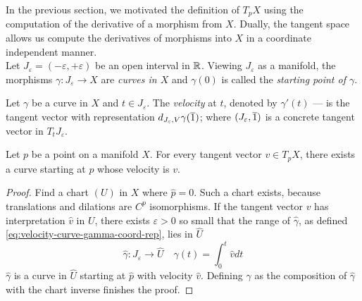 \documentclass[../main-v2-manifolds.tex]{subfiles}
\begin{document}
In the previous section, we motivated the definition of $T_pX$ using the computation of the derivative of a morphism from $X$. Dually, the tangent space allows us compute the derivatives of morphisms into $X$ in a coordinate independent manner.\\

Let $J_\varepsilon = (-\varepsilon, +\varepsilon)$ be an open interval in $\mathbb{R}$. Viewing $J_\varepsilon$ as a manifold, the morphisms $\gamma: J_\varepsilon\to X$ are \emph{curves in $X$} and $\gamma(0)$ is called the \emph{starting point of $\gamma$}.
\begin{definition}\label{def:velocity-of-a-curve}
    Let $\gamma$ be a curve in $X$ and $t\in J_\varepsilon$. The \emph{velocity} at $t$, denoted by $\gamma'(t)$ --- is the tangent vector with representation $d_{J_\varepsilon,V}\gamma(\overline{1})$; where $(J_\varepsilon,\overline{1})$ is a concrete tangent vector in $T_t J_\varepsilon$.
\end{definition}
\begin{wts}\label{prop:tangent-vectors-are-velocities}
    Let $p$ be a point on a manifold $X$. For every tangent vector $v\in T_p X$, there exists a curve starting at $p$ whose velocity is $v$.
\end{wts}
\begin{proof}
    Find a chart $(U)$ in $X$ where $\hat{p}=0$. Such a chart exists, because translations and dilations are $C^p$ isomorphisms. If the tangent vector $v$ has interpretation $\hat{v}$ in $U$, there exists $\varepsilon>0$ so small that the range of $\hat{\gamma}$, as defined \cref{eq:velocity-curve-gamma-coord-rep}, lies in $\hat{U}$
    \begin{equation}\label{eq:velocity-curve-gamma-coord-rep}
        \hat{\gamma}: J_\varepsilon\to \hat{U}\quad \gamma(t) = \int_0^t \hat{v}dt
    \end{equation}
    $\hat{\gamma}$ is a curve in $\hat{U}$ starting at $\hat{p}$ with velocity $\hat{v}$. Defining $\gamma$ as the composition of $\hat{\gamma}$ with the chart inverse finishes the proof.
\end{proof}
\end{document}
